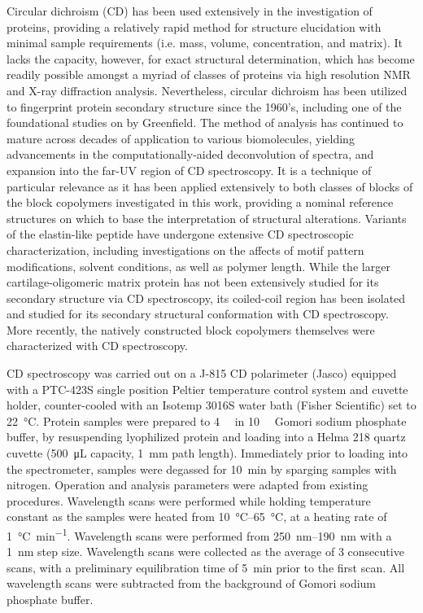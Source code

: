 \begin{refsection}
Circular dichroism (CD) has been used extensively in the investigation of
proteins, providing a relatively rapid method for structure elucidation with
minimal sample requirements (i.e. mass, volume, concentration, and matrix). It
lacks the capacity, however, for exact structural determination, which has
become readily possible amongst a myriad of classes of proteins via high
resolution NMR and X-ray diffraction analysis.\cite{Adler1973} Nevertheless,
circular dichroism has been utilized to fingerprint protein secondary structure
since the 1960's, including one of the foundational studies on
 by Greenfield.\cite{Greenfield1969} The method of
analysis has continued to mature across decades of application to various
biomolecules, yielding advancements in the computationally-aided deconvolution
of
spectra,\cite{Andrade1993,Sreerama1993,Manavalan1987,Provencher1981,Johnson1999}
and expansion into the far-UV region of CD
spectroscopy.\cite{Brahms1980,Wallace2009,Miles2006} It is a technique of
particular relevance as it has been applied extensively to both classes of
blocks of the block copolymers investigated in this work, providing a nominal
reference structures on which to base the interpretation of structural
alterations. Variants of the elastin-like peptide have undergone extensive CD
spectroscopic characterization, including investigations on the affects of motif
pattern modifications,\cite{Nuhn2008,Kim2005} solvent conditions,\cite{URRY1974}
as well as polymer length.\cite{Nuhn2008,Urry1986,Reiersen1998} While the larger
cartilage-oligomeric matrix protein has not been extensively studied for its
secondary structure via CD spectroscopy, its coiled-coil region has been
isolated and studied for its secondary structural conformation with CD
spectroscopy.\cite{Gunasekar2009,Terskikh1997} More recently, the natively
constructed block copolymers themselves were characterized with CD
spectroscopy.\cite{Haghpanah2009}

CD spectroscopy was carried out on a J-815 CD polarimeter (Jasco) equipped with
a PTC-423S single position Peltier temperature control system and cuvette
holder, counter-cooled with an Isotemp 3016S water bath (Fisher Scientific) set
to \SI{22}{\celsius}. Protein samples were prepared to \SI{4}{\micro\moLar} in
\SI{10}{\milli\moLar} Gomori sodium phosphate buffer, by resuspending lyophilized protein and
loading into a Helma 218 quartz cuvette (\SI{500}{\uL} capacity, \SI{1}{mm} path
length). Immediately prior to loading into the spectrometer, samples were
degassed for \SI{10}{\minute} by sparging samples with nitrogen. Operation and
analysis parameters were adapted from existing procedures.\cite{Haghpanah2009}
Wavelength scans were performed while holding temperature constant as the
samples were heated from \SIrange{10}{65}{\celsius}, at a heating rate of
\SI{1}{\celsius\per\minute}.  Wavelength scans were performed from
\SIrange{250}{190}{\nm} with a \SI{1}{\nm} step size. Wavelength scans were
collected as the average of 3 consecutive scans, with a preliminary
equilibration time of \SI{5}{\minute} prior to the first scan. All wavelength
scans were subtracted from the background of Gomori sodium phosphate buffer.


\end{refsection}
